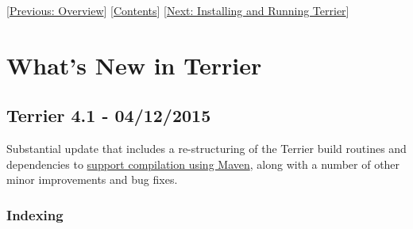 {[}\href{overview.html}{Previous: Overview}{]}
{[}\href{index.html}{Contents}{]} {[}\href{quickstart.html}{Next:
Installing and Running Terrier}{]}\\

\section{What's New in Terrier}\label{whats-new-in-terrier}

\subsection{Terrier 4.1 - 04/12/2015}\label{terrier-4.1---04122015}

Substantial update that includes a re-structuring of the Terrier build
routines and dependencies to
\href{terrier_develop.html\#compiling}{support compilation using Maven},
along with a number of other minor improvements and bug fixes.

\subsubsection{Indexing}\label{indexing}

